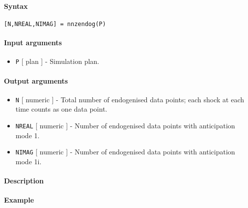 


	\paragraph{Syntax}

\begin{verbatim}
[N,NREAL,NIMAG] = nnzendog(P)
\end{verbatim}

\paragraph{Input arguments}

\begin{itemize}
\itemsep1pt\parskip0pt
\item
  \texttt{P} {[} plan {]} - Simulation plan.
\end{itemize}

\paragraph{Output arguments}

\begin{itemize}
\item
  \texttt{N} {[} numeric {]} - Total number of endogenised data points;
  each shock at each time counts as one data point.
\item
  \texttt{NREAL} {[} numeric {]} - Number of endogenised data points
  with anticipation mode 1.
\item
  \texttt{NIMAG} {[} numeric {]} - Number of endogenised data points
  with anticipation mode 1i.
\end{itemize}

\paragraph{Description}

\paragraph{Example}


